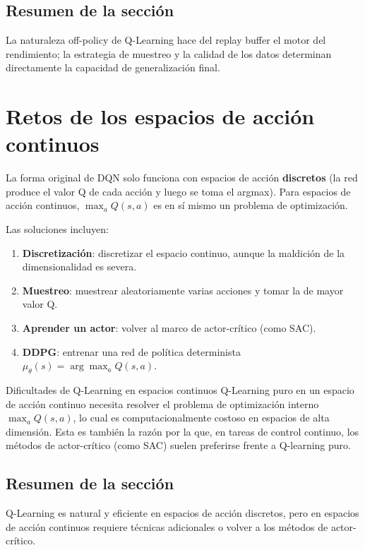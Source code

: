 \documentclass[a4paper]{article}
\begin{document}
\subsection{Resumen de la sección}

La naturaleza off-policy de Q-Learning hace del replay buffer el motor del rendimiento; la estrategia de muestreo y la calidad de los datos determinan directamente la capacidad de generalización final.

\section{Retos de los espacios de acción continuos}

La forma original de DQN solo funciona con espacios de acción \textbf{discretos} (la red produce el valor Q de cada acción y luego se toma el argmax). Para espacios de acción continuos, $\max_a Q(s,a)$ es en sí mismo un problema de optimización.

Las soluciones incluyen:
\begin{enumerate}
    \item \textbf{Discretización}: discretizar el espacio continuo, aunque la maldición de la dimensionalidad es severa.
    \item \textbf{Muestreo}: muestrear aleatoriamente varias acciones y tomar la de mayor valor Q.
    \item \textbf{Aprender un actor}: volver al marco de actor-crítico (como SAC).
    \item \textbf{DDPG}: entrenar una red de política determinista $\mu_\theta(s) = \arg\max_a Q(s,a)$.
\end{enumerate}

\begin{warningbox}{Dificultades de Q-Learning en espacios continuos}
Q-Learning puro en un espacio de acción continuo necesita resolver el problema de optimización interno $\max_a Q(s,a)$, lo cual es computacionalmente costoso en espacios de alta dimensión. Esta es también la razón por la que, en tareas de control continuo, los métodos de actor-crítico (como SAC) suelen preferirse frente a Q-learning puro.
\end{warningbox}

\subsection{Resumen de la sección}
 
Q-Learning es natural y eficiente en espacios de acción discretos, pero en espacios de acción continuos requiere técnicas adicionales o volver a los métodos de actor-crítico.
\end{document}
